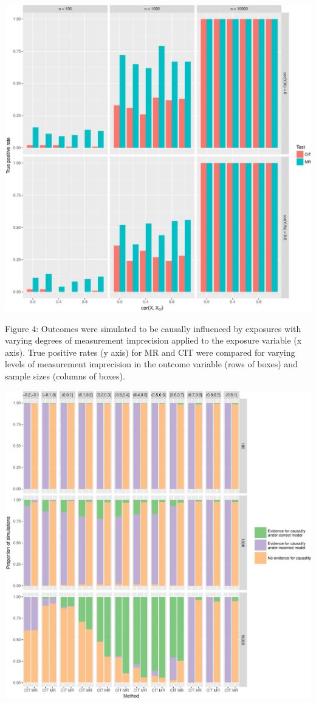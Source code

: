 \documentclass[]{article}
\begin{document}
\newpage

\includegraphics{manuscript_files/figure-latex/causality_exists_tpr-1.pdf}

Figure 4: Outcomes were simulated to be causally influenced by exposures
with varying degrees of measurement imprecision applied to the exposure
variable (x axis). True positive rates (y axis) for MR and CIT were
compared for varying levels of measurement imprecision in the outcome
variable (rows of boxes) and sample sizes (columns of boxes).

\newpage

\includegraphics{manuscript_files/figure-latex/cit_mr_comparison_figure-1.pdf}
\end{document}
